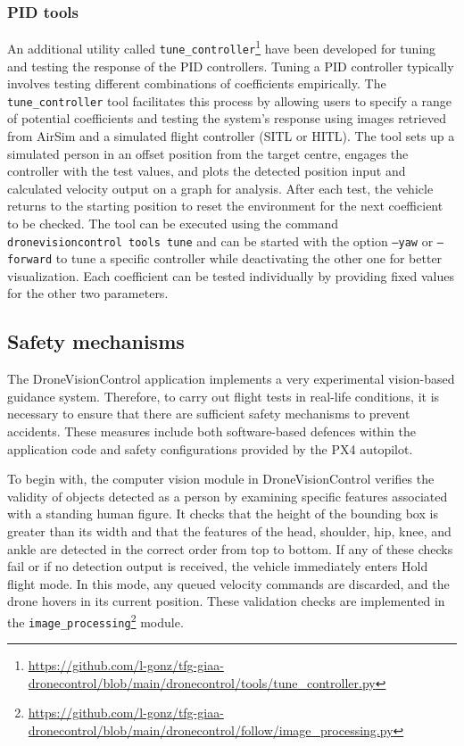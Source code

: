 \subsubsection{PID tools}
An additional utility called \texttt{tune\_controller}\footnote{\url{https://github.com/l-gonz/tfg-giaa-dronecontrol/blob/main/dronecontrol/tools/tune_controller.py}} have been developed for tuning and testing the response of the PID controllers. Tuning a PID controller typically involves testing different combinations of coefficients empirically. The \texttt{tune\_controller} tool facilitates this process by allowing users to specify a range of potential coefficients and testing the system's response using images retrieved from AirSim and a simulated flight controller (SITL or HITL). The tool sets up a simulated person in an offset position from the target centre, engages the controller with the test values, and plots the detected position input and calculated velocity output on a graph for analysis. After each test, the vehicle returns to the starting position to reset the environment for the next coefficient to be checked. The tool can be executed using the command \texttt{dronevisioncontrol tools tune} and can be started with the option \texttt{--yaw} or \texttt{--forward} to tune a specific controller while deactivating the other one for better visualization. Each coefficient can be tested individually by providing fixed values for the other two parameters.


\subsection{Safety mechanisms}
\label{subsec:safety}

The DroneVisionControl application implements a very experimental vision-based guidance system.
Therefore, to carry out flight tests in real-life conditions, it is necessary to ensure that there are sufficient safety mechanisms to prevent accidents.
These measures include both software-based defences within the application code and safety configurations provided by the PX4 autopilot.

To begin with, the computer vision module in DroneVisionControl verifies the validity of objects detected as a person by examining specific features associated with a standing human figure. It checks that the height of the bounding box is greater than its width and that the features of the head, shoulder, hip, knee, and ankle are detected in the correct order from top to bottom. If any of these checks fail or if no detection output is received, the vehicle immediately enters Hold flight mode. In this mode, any queued velocity commands are discarded, and the drone hovers in its current position. These validation checks are implemented in the \texttt{image\_processing}\footnote{\url{https://github.com/l-gonz/tfg-giaa-dronecontrol/blob/main/dronecontrol/follow/image_processing.py}} module.

